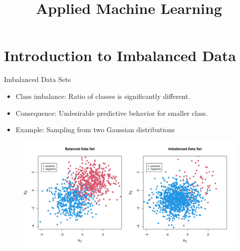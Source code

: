 \documentclass[11pt,compress,t,notes=noshow, xcolor=table]{beamer}
\title{Applied Machine Learning}
\date{}
\begin{document}



\section{Introduction to Imbalanced Data}
\sloppy

\begin{frame}{Imbalanced Data Sets}
%		    
            \begin{itemize}
		        \item Class imbalance: Ratio of classes is significantly different. 		     
		        \item Consequence: Undesirable predictive behavior for smaller class.	    
		        \item Example: Sampling from two Gaussian distributions 
		    \end{itemize}
		   
			\begin{figure}
				\centering
				\includegraphics[width=\linewidth]{figure_man/combined_data_plots.jpg}
			\end{figure}
%
\end{frame}
\end{document}
